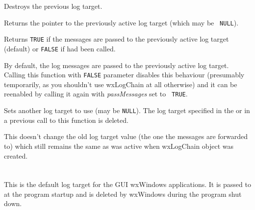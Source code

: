 

Destroys the previous log target.

\label{wxlogchaingetoldlog}


Returns the pointer to the previously active log target (which may be {\tt
NULL}).

\label{wxlogchainispassingmessages}


Returns {\tt TRUE} if the messages are passed to the previously active log
target (default) or {\tt FALSE} if  
had been called.

\label{wxlogchainpassmessages}


By default, the log messages are passed to the previously active log target.
Calling this function with {\tt FALSE} parameter disables this behaviour
(presumably temporarily, as you shouldn't use wxLogChain at all otherwise) and
it can be reenabled by calling it again with {\it passMessages} set to {\tt
TRUE}.

\label{wxlogchainsetlog}


Sets another log target to use (may be {\tt NULL}). The log target specified
in the  or in a previous call to
this function is deleted.

This doesn't change the old log target value (the one the messages are
forwarded to) which still remains the same as was active when wxLogChain
object was created.


\section{}\label{wxloggui}

This is the default log target for the GUI wxWindows applications. It is passed
to  at the program
startup and is deleted by wxWindows during the program shut down.

